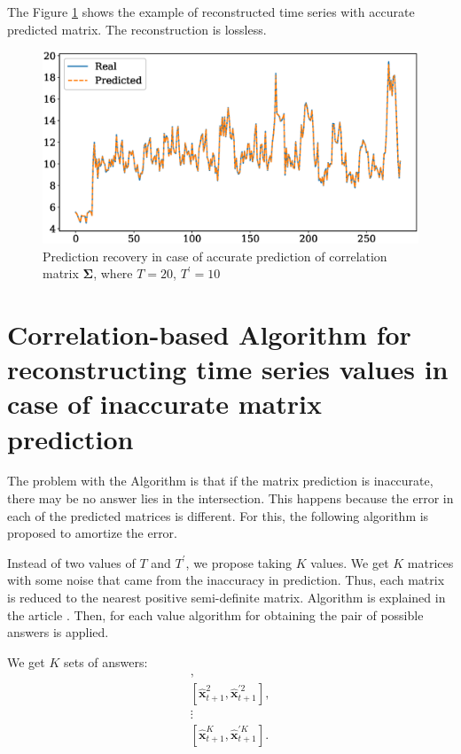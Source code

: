 \documentclass[12pt]{article}
\begin{document}
{The Figure \ref{fig:fig3} shows the example of reconstructed time series with accurate predicted matrix. The reconstruction is lossless.

\begin{figure}[!htbp]
	\centering
	\includegraphics[width=\textwidth]{IdealRecovery.eps}
	\caption{Prediction recovery in case of accurate prediction of correlation matrix $\mathbf{\Sigma}$, where $T=20$, $T^\prime=10$}
	\label{fig:fig3}
\end{figure}

\section{Correlation-based Algorithm for reconstructing time series values in case of inaccurate matrix prediction}

The problem with the Algorithm is that if the matrix prediction is inaccurate, there may be no answer lies in the intersection. This happens because the error in each of the predicted matrices is different. For this, the following algorithm is proposed to amortize the error.

Instead of two values of $T$ and $T^\prime$, we propose taking $K$ values. We get $K$ matrices with some noise that came from the inaccuracy in prediction. Thus, each matrix is reduced to the nearest positive semi-definite matrix. Algorithm is explained in the article \cite{HIGHAM1988103}.
Then, for each value algorithm for obtaining the pair of possible answers is applied.

We get $K$ sets of answers:
\begin{gather*}
	[\hat{\mathbf{x}}_{t+1}^1, \hat{\mathbf{x}}^{\prime 1}_{t+1}],\\
	[\hat{\mathbf{x}}_{t+1}^2, \hat{\mathbf{x}}^{\prime 2}_{t+1}],\\
	\vdots \\
	[\hat{\mathbf{x}}_{t+1}^K, \hat{\mathbf{x}}^{\prime K}_{t+1}].
\end{gather*}

}
\end{document}
